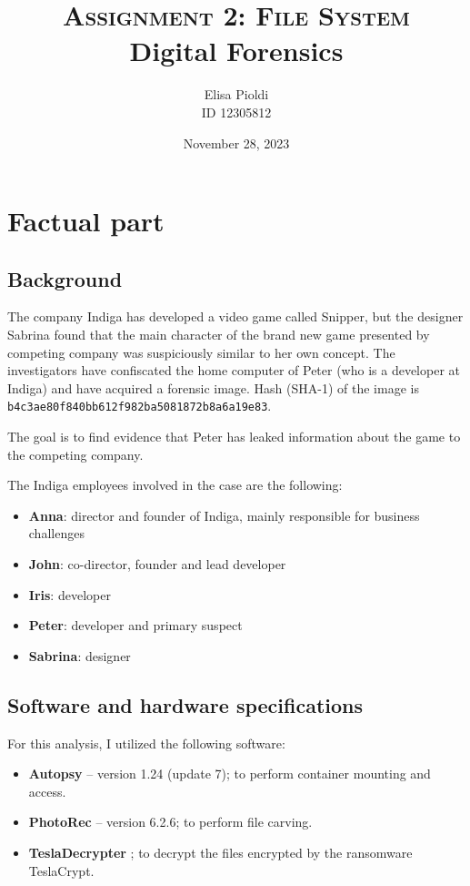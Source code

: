 \documentclass[12pt]{article}
\title{\textbf{\textsc{Assignment 2: File System}}\\Digital Forensics}
\author{Elisa Pioldi\\
        ID 12305812}
\date{November 28, 2023}
\begin{document}
\maketitle

\section{Factual part}

\subsection{Background}

The company Indiga has developed a video game called Snipper, but the designer Sabrina found that the main character of the brand new game presented by competing company was suspiciously similar to her own concept.
The investigators have confiscated the home computer of Peter (who is a developer at Indiga) and have acquired a forensic image. 
Hash (SHA-1) of the image is \texttt{b4c3ae80f840bb612f982ba5081872b8a6a19e83}.

The goal is to find evidence that Peter has leaked information about the game to the competing company.

The Indiga employees involved in the case are the following:
\begin{itemize}
    \item \textbf{Anna}: director and founder of Indiga, mainly responsible for business challenges
    \item \textbf{John}: co-director, founder and lead developer
    \item \textbf{Iris}: developer
    \item \textbf{Peter}: developer and primary suspect
    \item \textbf{Sabrina}: designer
\end{itemize}

\subsection{Software and hardware specifications}
\label{sec:specs}

For this analysis, I utilized the following software:

\begin{itemize}
    \item \textbf{Autopsy} \cite{autopsy} -- version 1.24 (update 7); to perform container mounting and access.
    \item \textbf{PhotoRec} \cite{photorec} -- version 6.2.6; to perform file carving. 
    \item \textbf{TeslaDecrypter} \cite{tesla-decrypt}; to decrypt the files encrypted by the ransomware TeslaCrypt.
\end{itemize}
\end{document}
